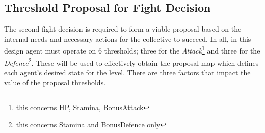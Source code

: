 
\pagebreak

\subsection{Threshold Proposal for Fight Decision}
    
    The second fight decision is required to form a viable proposal based on the internal needs and necessary actions for the collective to succeed. In all, in this design agent must operate on 6 thresholds; three for the \textit{Attack}\footnote{this concerns HP, Stamina, BonusAttack} and three for the \textit{Defence}\footnote{this concerns Stamina and BonusDefence only}. These will be used to effectively obtain the proposal map which defines each agent's desired state for the level. There are three factors that impact the value of the proposal thresholds.
    
